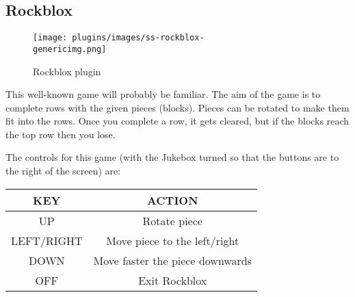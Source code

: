 \subsection{Rockblox}
\begin{figure}[h!]
\begin{center}
\texttt{[image: plugins/images/ss-rockblox-\\genericimg.png]}
\end{center}
\caption{Rockblox plugin}
\end{figure}

This well{}-known game will probably be familiar. The aim of the game is
to complete rows with the given pieces (blocks). Pieces can be rotated
to make them fit into the rows.  Once you complete a row, it gets
cleared, but if the blocks reach the top row then you lose.

The controls for this game (with the Jukebox turned so that the buttons
are to the right of the screen) are:

\begin{table}[h!]
\begin{center}
\begin{tabular}{|c|c|}
\hline
KEY & ACTION \\\hline
UP & Rotate piece \\\hline
LEFT/RIGHT & Move piece to the left/right \\\hline
DOWN & Move faster the piece downwards \\\hline
OFF & Exit Rockblox\\\hline
\end{tabular}
\end{center}
\end{table}
